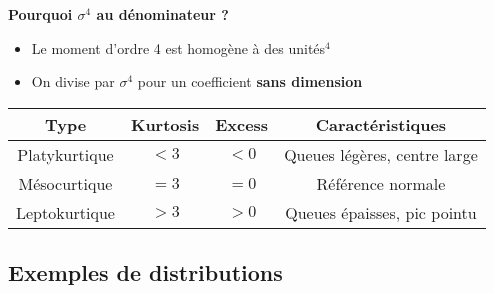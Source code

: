 \begin{intuitionbox}
\medskip

\textbf{Pourquoi $\sigma^4$ au dénominateur ?}
\begin{itemize}
    \item Le moment d'ordre 4 est homogène à des unités$^4$
    \item On divise par $\sigma^4$ pour un coefficient \textbf{sans dimension}
\end{itemize}

\begin{center}
\begin{tabular}{|c|c|c|c|}
\hline
\textbf{Type} & \textbf{Kurtosis} & \textbf{Excess} & \textbf{Caractéristiques} \\
\hline
Platykurtique & $< 3$ & $< 0$ & Queues légères, centre large \\
\hline
Mésocurtique & $= 3$ & $= 0$ & Référence normale \\
\hline
Leptokurtique & $> 3$ & $> 0$ & Queues épaisses, pic pointu \\
\hline
\end{tabular}
\end{center}
\end{intuitionbox}

\subsection{Exemples de distributions}

